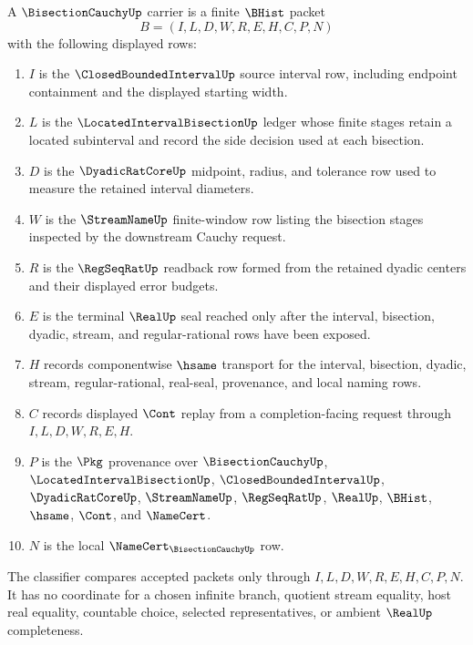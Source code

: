 \begin{definition}
\label{def:bisection-cauchy-carrier}
A $\BisectionCauchyUp$ carrier is a finite $\BHist$ packet
$$
B=(I,L,D,W,R,E,H,C,P,N)
$$
with the following displayed rows:
\begin{enumerate}
\item $I$ is the $\ClosedBoundedIntervalUp$ source interval row, including endpoint containment and the displayed starting width.
\item $L$ is the $\LocatedIntervalBisectionUp$ ledger whose finite stages retain a located subinterval and record the side decision used at each bisection.
\item $D$ is the $\DyadicRatCoreUp$ midpoint, radius, and tolerance row used to measure the retained interval diameters.
\item $W$ is the $\StreamNameUp$ finite-window row listing the bisection stages inspected by the downstream Cauchy request.
\item $R$ is the $\RegSeqRatUp$ readback row formed from the retained dyadic centers and their displayed error budgets.
\item $E$ is the terminal $\RealUp$ seal reached only after the interval, bisection, dyadic, stream, and regular-rational rows have been exposed.
\item $H$ records componentwise $\hsame$ transport for the interval, bisection, dyadic, stream, regular-rational, real-seal, provenance, and local naming rows.
\item $C$ records displayed $\Cont$ replay from a completion-facing request through $I,L,D,W,R,E,H$.
\item $P$ is the $\Pkg$ provenance over $\BisectionCauchyUp$, $\LocatedIntervalBisectionUp$, $\ClosedBoundedIntervalUp$, $\DyadicRatCoreUp$, $\StreamNameUp$, $\RegSeqRatUp$, $\RealUp$, $\BHist$, $\hsame$, $\Cont$, and $\NameCert$.
\item $N$ is the local $\NameCert_{\BisectionCauchyUp}$ row.
\end{enumerate}
The classifier compares accepted packets only through $I,L,D,W,R,E,H,C,P,N$. It has no coordinate for a chosen infinite branch, quotient stream equality, host real equality, countable choice, selected representatives, or ambient $\RealUp$ completeness.
\end{definition}

